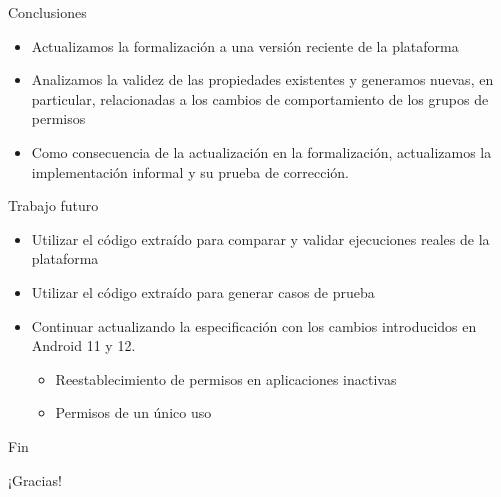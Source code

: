 \documentclass[pdf, handout]{beamer} %
\begin{document}
\begin{frame}{Conclusiones}
    \begin{itemize}[<+->]
        \item Actualizamos la formalización a una versión reciente de la plataforma
        \item Analizamos la validez de las propiedades existentes y generamos nuevas, en particular,
              relacionadas a los cambios de comportamiento de los grupos de permisos
        \item Como consecuencia de la actualización en la formalización, actualizamos la
              implementación informal  y su prueba de corrección.
    \end{itemize}
\end{frame}

\begin{frame}{Trabajo futuro}
    \begin{itemize}[<+->]
        \item Utilizar el código extraído para comparar y validar ejecuciones reales de la
              plataforma
        \item Utilizar el código extraído para generar casos de prueba
        \item Continuar actualizando la especificación con los cambios introducidos en Android 11 y
              12.
              \begin{itemize}
                  \item Reestablecimiento de permisos en aplicaciones inactivas
                  \item Permisos de un único uso
              \end{itemize}
    \end{itemize}
\end{frame}

\begin{frame}{Fin}
    \begin{center}
        \huge¡Gracias!
    \end{center}
\end{frame}

\end{document}
